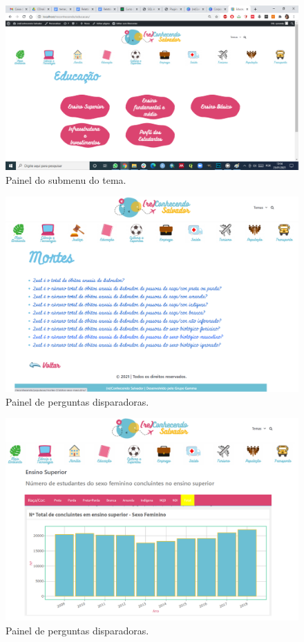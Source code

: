 \documentclass[
]{book}
\begin{document}
\begin{figure}
\includegraphics[width=1\linewidth]{images/image74} \caption{Painel do submenu do tema.}\label{fig:painelsubtrecossa}
\end{figure}

\begin{figure}
\includegraphics[width=1\linewidth]{images/image92} \caption{Painel de perguntas disparadoras.}\label{fig:paineldisptrecossa}
\end{figure}

\begin{figure}
\includegraphics[width=1\linewidth]{images/image77} \caption{Painel de perguntas disparadoras.}\label{fig:dashtrecossa}
\end{figure}
\end{document}

